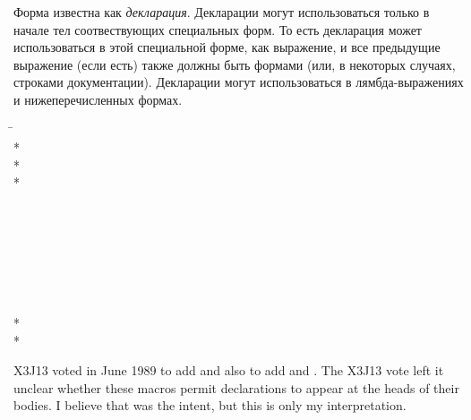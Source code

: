 \begin{defspec}
Форма  известна как \emph{декларация}.
Декларации могут использоваться только в начале тел соотвествующих специальных
форм. То есть декларация может использоваться в этой специальной форме, как
выражение, и все предыдущие  выражение (если есть) также должны быть формами
 (или, в некоторых случаях, строками документации).
Декларации могут использоваться в лямбда-выражениях и нижеперечисленных формах.
\begin{lisp}
\hskip 12pc\=\kill
{}\> \\*
\> \\*
\> \\*
\> \\
\> \\
\> \\
\> \\
\> \\
\> \\
\> \\
\> \\*
\> \\*
\end{lisp}

X3J13 voted in June 1989  to add 
and also  to add 
and .
The X3J13 vote left it unclear whether these macros
permit declarations to appear at the heads of their bodies.
I believe that was the intent,
but this is only my interpretation.


\end{defspec}
